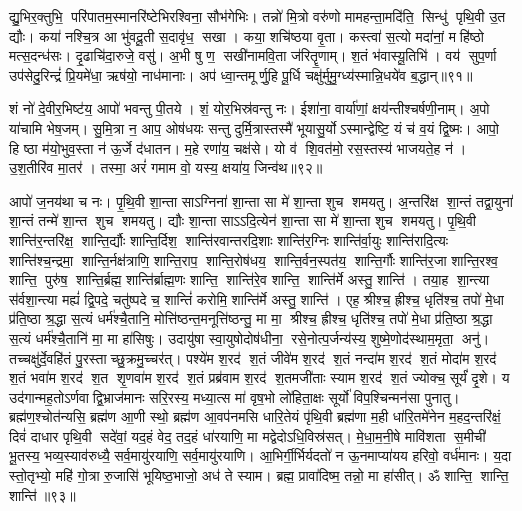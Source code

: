 द्यु॒भिर॒क्तुभि॒ परि॑पातम॒स्मानरि॑ष्टेभिरश्विना॒ सौभ॑गेभिः। 
तन्नो॑ मि॒त्रो वरु॑णो मामहन्ता॒मदि॑ति॒ सिन्धु॑ पृथि॒वी उ॒त द्यौः। 
कया॑ नश्चि॒त्र आ भु॑वदू॒ती स॒दावृ॑ध॒ सखा। 
कया॒ शचि॑ष्ठया वृ॒ता। 
कस्त्वा॑ स॒त्यो मदा॑नां॒ महि॑ष्ठो मत्स॒दन्ध॑सः। 
दृ॒ढाचि॑दा॒रुजे॒ वसु॑। 
अ॒भी षु ण॒ सखी॑नामवि॒ता ज॑रितॄ॒णाम्। 
श॒तं भ॑वास्यू॒तिभि॑। 
वय॑ सुप॒र्णा उप॑सेदु॒रिन्द्रं॑ प्रि॒यमे॑धा॒ ऋष॑यो॒ नाध॑मानाः। 
अप॑ ध्वा॒न्तमूर्णु॒हि पू॒र्धि चक्षु॑र्मुमु॒ग्ध्य॑स्मान्नि॒धये॑व ब॒द्धान्॥९१॥

शं नो॑ दे॒वीर॒भिष्ट॑य॒ आपो॑ भवन्तु पी॒तये। 
शं॒ योर॒भिस्र॑वन्तु नः। 
ईशा॑ना॒ वार्या॑णां॒ क्षय॑न्तीश्चर्\mbox{}षणी॒नाम्। 
अ॒पो या॑चामि भेष॒जम्। 
सु॒मि॒त्रा न॒ आप॒ ओष॑धयः सन्तु दुर्मि॒त्रास्तस्मै॑ भूयासु॒र्योऽस्मान्द्वेष्टि॒ यं च॑ व॒यं द्वि॒ष्मः। 
आपो॒ हि ष्ठा म॑यो॒भुव॒स्ता न॑ ऊ॒र्जे द॑धातन। 
म॒हे रणा॑य॒ चक्ष॑से। 
यो व॑ शि॒वत॑मो॒ रस॒स्तस्य॑ भाजयते॒ह न॑। 
उ॒श॒तीरि॑व मा॒तर॑। 
तस्मा॒ अरं॑ गमाम वो॒ यस्य॒ क्षया॑य॒ जिन्व॑थ॥९२॥

आपो॑ ज॒नय॑था च नः। 
पृ॒थि॒वी शा॒न्ता साऽग्निना॑ शा॒न्ता सा मे॑ शा॒न्ता शुच शमयतु। 
अ॒न्तरि॑क्ष शा॒न्तं तद्वा॒युना॑ शा॒न्तं तन्मे॑ शा॒न्त शुच शमयतु। 
द्यौः  शा॒न्ता साऽऽदि॒त्येन॑ शा॒न्ता सा मे॑ शा॒न्ता शुच शमयतु। 
पृ॒थि॒वी शान्ति॑र॒न्तरि॑क्ष॒ शान्ति॒र्द्यौः  शान्ति॒र्दिश॒ शान्ति॑रवान्तरदि॒शाः  शान्ति॑र॒ग्निः  शान्ति॑र्वा॒युः  शान्ति॑रादि॒त्यः  शान्ति॑श्च॒न्द्रमा॒ शान्ति॒र्नक्ष॑त्राणि॒ शान्ति॒राप॒ शान्ति॒रोष॑धय॒ शान्ति॒र्वन॒स्पत॑य॒ शान्ति॒र्गौः  शान्ति॑र॒जा शान्ति॒रश्व॒ शान्ति॒ पुरु॑ष॒ शान्ति॒र्ब्रह्म॒ शान्ति॑र्ब्राह्म॒णः  शान्ति॒ शान्ति॑रे॒व शान्ति॒ शान्ति॑र्मे अस्तु॒ शान्ति॑। 
तया॒ह शा॒न्त्या स॑र्वशा॒न्त्या मह्यं॑ द्वि॒पदे॒ चतु॑ष्पदे च॒ शान्तिं॑ करोमि॒ शान्ति॑र्मे अस्तु॒ शान्ति॑। 
एह॒ श्रीश्च॒ ह्रीश्च॒ धृति॑श्च॒ तपो॑ मे॒धा प्र॑ति॒ष्ठा श्र॒द्धा स॒त्यं धर्म॑श्चै॒तानि॒ मोत्ति॑ष्ठन्त॒मनूत्ति॑ष्ठन्तु॒ मा मा॒ श्रीश्च॒ ह्रीश्च॒ धृति॑श्च॒ तपो॑ मे॒धा प्र॑ति॒ष्ठा श्र॒द्धा स॒त्यं धर्म॑श्चै॒तानि॑ मा॒ मा हा॑सिषुः। 
उदायु॑षा स्वा॒युषोदोष॑धीना॒ रसे॒नोत्प॒र्जन्य॑स्य॒ शुष्मे॒णोद॑स्थाम॒मृता॒ अनु॑। 
तच्चक्षु॑र्दे॒वहि॑तं पु॒रस्ताच्छु॒क्रमु॒च्चर॑त्। 
पश्ये॑म श॒रद॑ श॒तं जीवे॑म श॒रद॑ श॒तं नन्दा॑म श॒रद॑ श॒तं मोदा॑म श॒रद॑ श॒तं भवा॑म श॒रद॑ श॒त शृ॒णवा॑म श॒रद॑ श॒तं प्रब्र॑वाम श॒रद॑ श॒तमजी॑ताः स्याम श॒रद॑ श॒तं ज्योक्च॒ सूर्यं॑ दृ॒शे। 
य उद॑गान्मह॒तोऽर्णवाद्वि॒भ्राज॑मानः सरि॒रस्य॒ मध्या॒त्स मा॑ वृष॒भो लो॑हिता॒क्षः सूर्यो॑ विप॒श्चिन्मन॑सा पुनातु। 
ब्रह्म॑ण॒श्चोत॑न्यसि॒ ब्रह्म॑ण आ॒णी स्थो॒ ब्रह्म॑ण आ॒वप॑नमसि धारि॒तेयं पृ॑थि॒वी ब्रह्म॑णा म॒ही धा॑रि॒तमे॑नेन म॒हद॒न्तरि॑क्षं॒ दिवं॑ दाधार पृथि॒वी सदे॑वां॒ यद॒हं वेद॒ तद॒हं धा॑रयाणि॒ मा मद्वेदोऽधि॒विस्र॑सत्। 
मे॒धा॒म॒नी॒षे मावि॑शता स॒मीची॑ भू॒तस्य॒ भव्य॒स्याव॑रुध्यै॒ सर्व॒मायु॑रयाणि॒ सर्व॒मायु॑रयाणि। 
आ॒भिर्गी॒र्भिर्यदतो॑ न ऊ॒नमाप्या॑यय हरिवो॒ वर्ध॑मानः। 
य॒दा स्तो॒तृभ्यो॒ महि॑ गो॒त्रा रु॒जासि॑ भूयिष्ठ॒भाजो॒ अध॑ ते स्याम। 
ब्रह्म॒ प्रावा॑दिष्म॒ तन्नो॒ मा हा॑सीत्। 
ॐ शान्ति॒ शान्ति॒ शान्ति॑॥९३॥\anuvakamend[प॒रा॒वतो॑ दधातु ब॒द्धां जिन्व॑थ दृ॒शे स॒प्त च॑]

